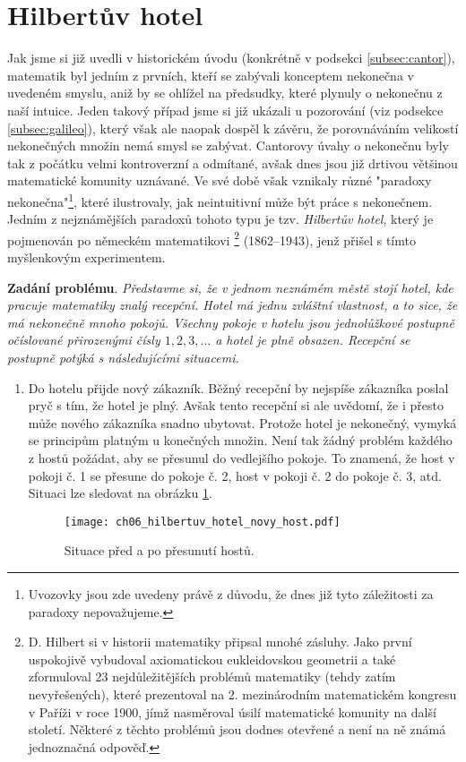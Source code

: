\section{Hilbertův hotel}\label{sec:hilbertuv_hotel}
Jak jsme si již uvedli v historickém úvodu (konkrétně v podsekci \ref{subsec:cantor}), matematik  byl jedním z prvních, kteří se zabývali konceptem nekonečna v uvedeném smyslu, aniž by se ohlížel na předsudky, které plynuly o nekonečnu z naší intuice. Jeden takový případ jsme si již ukázali u pozorování  (viz podsekce \ref{subsec:galileo}), který však ale naopak dospěl k závěru, že porovnáváním velikostí nekonečných množin nemá smysl se zabývat. Cantorovy úvahy o nekonečnu byly tak z počátku velmi kontroverzní a odmítané, avšak dnes jsou již drtivou většinou matematické komunity uznávané. Ve své době však vznikaly různé "paradoxy nekonečna"\footnote{Uvozovky jsou zde uvedeny právě z důvodu, že dnes již tyto záležitosti za paradoxy nepovažujeme.}, které ilustrovaly, jak neintuitivní může být práce s nekonečnem. Jedním z nejznámějších paradoxů tohoto typu je tzv. \emph{Hilbertův hotel}, který je pojmenován po německém matematikovi \mbox{}\footnote{D. Hilbert si v historii matematiky připsal mnohé zásluhy. Jako první uspokojivě vybudoval axiomatickou eukleidovskou geometrii a také zformuloval 23 nejdůležitějších problémů matematiky (tehdy zatím nevyřešených), které prezentoval na 2. mezinárodním matematickém kongresu v Paříži v roce 1900, jímž nasměroval úsilí matematické komunity na další století. Některé z těchto problémů jsou dodnes otevřené a není na ně známá jednoznačná odpověď.} (1862--1943), jenž přišel s tímto myšlenkovým experimentem.
\medskip

\noindent\textbf{Zadání problému}. \textit{Představme si, že v jednom neznámém městě stojí hotel, kde pracuje matematiky znalý recepční. Hotel má jednu zvláštní vlastnost, a to sice, že má nekonečně mnoho pokojů. Všechny pokoje v hotelu jsou jednolůžkové postupně očíslované přirozenými čísly $1,2,3,\dots$ a hotel je plně obsazen. Recepční se postupně potýká s následujícími situacemi.}
\begin{enumerate}[label=\textit{(\roman*)}]
    \item Do hotelu přijde nový zákazník. Běžný recepční by nejspíše zákazníka poslal pryč s tím, že hotel je plný. Avšak tento recepční si ale uvědomí, že i přesto může nového zákazníka snadno ubytovat. Protože hotel je nekonečný, vymyká se principům platným u konečných množin. Není tak žádný problém každého z hostů požádat, aby se přesunul do vedlejšího pokoje. To znamená, že host v pokoji č. 1 se přesune do pokoje č. 2, host v pokoji č. 2 do pokoje č. 3, atd. Situaci lze sledovat na obrázku \ref{fig:hilbertuv_hotel_novy_host}.
    \begin{figure}[H]
        \centering
        \texttt{[image: ch06\_hilbertuv\_hotel\_novy\_host.pdf]}
        \caption{Situace před a po přesunutí hostů.}
        \label{fig:hilbertuv_hotel_novy_host}
    \end{figure}
\end{enumerate}